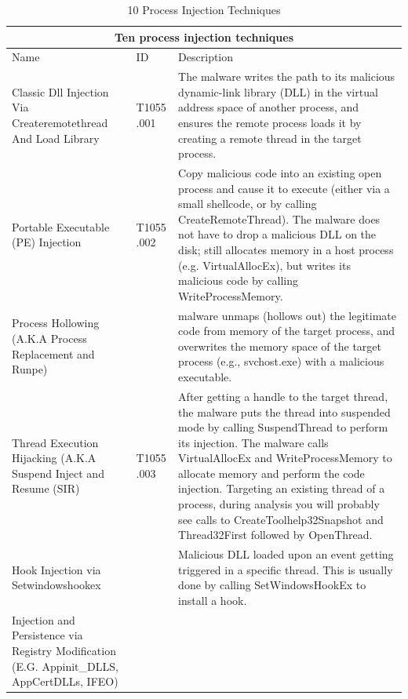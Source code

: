 \documentclass{article}
\begin{document}
\begin{table}[!ht]
\centering
\caption{10 Process Injection Techniques \autocite{Hosseini:2017}}
\begin{tabular}{ |p{3.5cm}||p{1.2cm}|p{10cm}|  }
  \hline
  \multicolumn{3}{|c|}{Ten process injection techniques} \\
  \hline
  Name	& ID & Description \\
  \hline
  Classic Dll Injection Via Createremotethread And Load Library
        & T1055 .001
             & The malware writes the path to its malicious dynamic-link
               library (DLL) in the virtual address space of another process,
               and ensures the remote process loads it by creating a remote thread in the target process. \\
  \hline
  Portable Executable (PE) Injection
        & T1055 .002
             & Copy malicious code into an existing open process and cause it to execute (either via a
               small shellcode, or by calling CreateRemoteThread). The malware does not have to drop a
               malicious DLL on the disk; still allocates memory in a host process (e.g. VirtualAllocEx),
               but writes its malicious code by calling WriteProcessMemory. \\
  \hline
  Process Hollowing (A.K.A Process Replacement and Runpe)
        &
             & malware unmaps (hollows out) the legitimate code from memory of the target process, and
               overwrites the memory space of the target process (e.g., svchost.exe) with a malicious executable.\\
  \hline
  Thread Execution Hijacking (A.K.A Suspend Inject and Resume (SIR)
        & T1055 .003
             & After getting a handle to the target thread, the malware puts the thread into suspended mode by
               calling SuspendThread to perform its injection. The malware calls VirtualAllocEx and
               WriteProcessMemory to allocate memory and perform the code injection. Targeting an existing thread
               of a process, during analysis you will probably see calls to CreateToolhelp32Snapshot and
               Thread32First followed by OpenThread. \\
  \hline
  Hook Injection via Setwindowshookex
        &
             & Malicious DLL loaded upon an event getting triggered in a specific thread. This is usually
               done by calling SetWindowsHookEx to install a hook. \\
  \hline
  Injection and Persistence via Registry Modification (E.G. Appinit\_DLLS, AppCertDLLs, IFEO)

\end{tabular}
\end{table}
\end{document}
